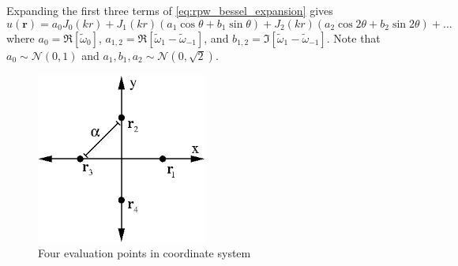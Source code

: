 \documentclass{report}
\newcommand{\rr}[0]{\mathbf{r}}
\begin{document}
Expanding the first three terms of \ref{eq:rpw_bessel_expansion} gives
\[
u(\rr) = a_{0} J_{0}(kr) + J_{1}(kr) (a_{1} \cos{\theta} + b_{1} \sin{\theta}) + J_{2}(kr) (a_{2} \cos{2 \theta} + b_{2} \sin{2 \theta}) + \ldots
\]
where $a_{0} = \Re \left[ \tilde{\omega}_{0} \right]$, $a_{1,2} = \Re \left[ \tilde{\omega}_{1} - \tilde{\omega}_{-1} \right]$, and $b_{1,2} = \Im \left[ \tilde{\omega}_{1} - \tilde{\omega}_{-1} \right]$. Note that $a_{0} \sim \mathcal{N}(0,1)$ and $a_{1}, b_{1}, a_{2} \sim \mathcal{N}(0,\sqrt{2})$.

\begin{figure}
  \begin{center}
    \includegraphics[width=0.5\textwidth]{figs/interpolation/four_points_on_axes.eps}
    \caption{Four evaluation points in coordinate system}
    \label{fig:four_points}
  \end{center}
\end{figure}
\end{document}
